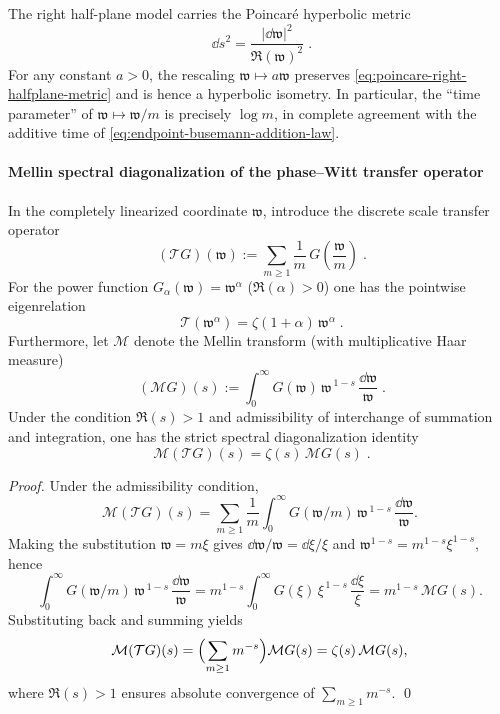 \medskip
The right half-plane model carries the Poincar{\'e} hyperbolic metric
\begin{equation}\label{eq:poincare-right-halfplane-metric}
\boxed{\;\dd s^{2}=\frac{|\dd \mathfrak{w}|^{2}}{\Re(\mathfrak{w})^{2}}\; }.
\end{equation}
For any constant \(a>0\), the rescaling \(\mathfrak{w}\mapsto a\mathfrak{w}\) preserves \eqref{eq:poincare-right-halfplane-metric} and is hence a hyperbolic isometry.
In particular, the ``time parameter'' of \(\mathfrak{w}\mapsto \mathfrak{w}/m\) is precisely \(\log m\), in complete agreement with the additive time of \eqref{eq:endpoint-busemann-addition-law}.

\paragraph{Mellin spectral diagonalization of the phase--Witt transfer operator}
In the completely linearized coordinate \(\mathfrak{w}\), introduce the discrete scale transfer operator
\begin{equation}\label{eq:scale-transfer-operator}
\boxed{\;
(\mathcal{T}G)(\mathfrak{w})
:=\sum_{m\ge 1}\frac{1}{m}\,G\!\left(\frac{\mathfrak{w}}{m}\right)\; }.
\end{equation}
For the power function \(G_{\alpha}(\mathfrak{w})=\mathfrak{w}^{\alpha}\) (\(\Re(\alpha)>0\)) one has the pointwise eigenrelation
\begin{equation}\label{eq:scale-transfer-eigen-monomial}
\boxed{\;
\mathcal{T}(\mathfrak{w}^{\alpha})=\zeta(1+\alpha)\,\mathfrak{w}^{\alpha}\; }.
\end{equation}
Furthermore, let \(\mathcal{M}\) denote the Mellin transform (with multiplicative Haar measure)
\begin{equation}\label{eq:scale-mellin-transform}
\boxed{\;
(\mathcal{M}G)(s):=\int_{0}^{\infty} G(\mathfrak{w})\,\mathfrak{w}^{\,1-s}\,\frac{\dd \mathfrak{w}}{\mathfrak{w}}\; }.
\end{equation}
Under the condition \(\Re(s)>1\) and admissibility of interchange of summation and integration, one has the strict spectral diagonalization identity
\begin{equation}\label{eq:scale-mellin-diagonalization}
\boxed{\;\mathcal{M}(\mathcal{T}G)(s)=\zeta(s)\,\mathcal{M}G(s)\; }.
\end{equation}
\begin{proof}
Under the admissibility condition,
\[
\mathcal{M}(\mathcal{T}G)(s)
=\sum_{m\ge 1}\frac{1}{m}\int_{0}^{\infty}G(\mathfrak{w}/m)\,\mathfrak{w}^{\,1-s}\,\frac{\dd\mathfrak{w}}{\mathfrak{w}}.
\]
Making the substitution \(\mathfrak{w}=m\xi\) gives \(\dd\mathfrak{w}/\mathfrak{w}=\dd\xi/\xi\) and \(\mathfrak{w}^{1-s}=m^{1-s}\xi^{1-s}\), hence
\[
\int_{0}^{\infty}G(\mathfrak{w}/m)\,\mathfrak{w}^{\,1-s}\,\frac{\dd\mathfrak{w}}{\mathfrak{w}}
=m^{1-s}\int_{0}^{\infty}G(\xi)\,\xi^{\,1-s}\,\frac{\dd\xi}{\xi}
=m^{1-s}\,\mathcal{M}G(s).
\]
Substituting back and summing yields
\[
\mathcal{M}(\mathcal{T}G)(s)
=\Bigl(\sum_{m\ge 1}m^{-s}\Bigr)\mathcal{M}G(s)
=\zeta(s)\,\mathcal{M}G(s),
\]
where \(\Re(s)>1\) ensures absolute convergence of \(\sum_{m\ge 1}m^{-s}\). \qed
\end{proof}
